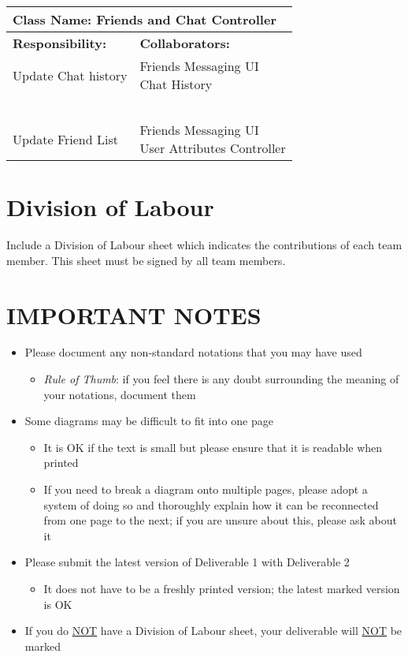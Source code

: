 \documentclass[]{article}
\begin{document}
\begin{table}[H]
    \centering
    \begin{tabular}{|p{5cm}|p{5cm}|}
        \hline
        \multicolumn{2}{|l|}{\textbf{Class Name:} Friends and Chat Controller}\\
        \hline
        \textbf{Responsibility:} & \textbf{Collaborators:}\\
        \hline
        Update Chat history & \makecell[l]{Friends Messaging UI\\Chat History}\\
        ~ & ~\\
        Update Friend List & \makecell[l]{Friends Messaging UI\\User Attributes Controller}\\
        \hline
    \end{tabular}
\end{table}

\newpage
\appendix
\section{Division of Labour}
\label{sec:division_of_labour}
Include a Division of Labour sheet which indicates the contributions of each team member. This sheet must be signed by all team members.

\newpage
\section*{IMPORTANT NOTES}
\begin{itemize}
	\item Please document any non-standard notations that you may have used
	\begin{itemize}
		\item \emph{Rule of Thumb}: if you feel there is any doubt surrounding the meaning of your notations, document them
	\end{itemize}
	\item Some diagrams may be difficult to fit into one page
	\begin{itemize}
		\item It is OK if the text is small but please ensure that it is readable when printed
		\item If you need to break a diagram onto multiple pages, please adopt a system of doing so and thoroughly explain how it can be reconnected from one page to the next; if you are unsure about this, please ask about it
	\end{itemize}
	\item Please submit the latest version of Deliverable 1 with Deliverable 2
	\begin{itemize}
		\item It does not have to be a freshly printed version; the latest marked version is OK
	\end{itemize}
	\item If you do \underline{NOT} have a Division of Labour sheet, your deliverable will \underline{NOT} be marked
\end{itemize}
\end{document}
